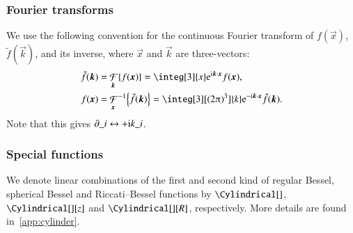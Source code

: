 \subsubsection{Fourier transforms} %
We use the following convention for the continuous Fourier transform of $f(\vec{x})$, $\tilde{f}(\vec{k})$, and its inverse, where $\vec{x}$ and $\vec{k}$ are three-vectors:
\begin{equation}\label{eq:notation:Fourier_transform_and_inverse}
    \begin{split}
        \tilde{f}(\vec{k}) &={\mathop{\mathcal{F}}_{\vec{k}}} {\cclosed{f(\vec{x})}}  =\integ[3]{x}\eu[\im \vec{k}\cdot \vec{x}]f(\vec{x}), \\
        f(\vec{x}) &=  {\mathop{\mathcal{F}}_{\vec{x}}}^{-1}  {\cclosed{\tilde{f}(\vec{k})}}  =\integ[3][(2\ppi)^3]{k} \eu[-\im \vec{k}\cdot \vec{x}]\tilde{f}(\vec{k}).
    \end{split}
\end{equation}
Note that this gives $\partial\_i \leftrightarrow +\mathrm{i} k\_i$.





\subsubsection{Special functions} %
We denote linear combinations of the first and second kind of regular Bessel, spherical Bessel and Riccati--Bessel functions by $\Cylindrical[]$, $\Cylindrical[][z]$ and $\Cylindrical[][R]$, respectively. More details are found in~\cref{app:cylinder}.

